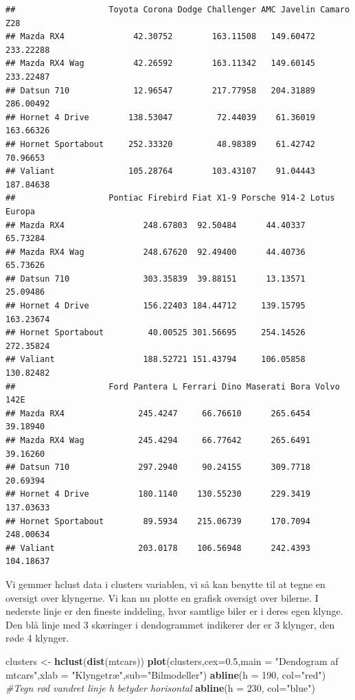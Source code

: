 \documentclass[]{book}
\newenvironment{Shaded}{\begin{snugshade}}{\end{snugshade}}
\newcommand{\CommentTok}[1]{\textcolor[rgb]{0.56,0.35,0.01}{\textit{#1}}}
\newcommand{\DataTypeTok}[1]{\textcolor[rgb]{0.13,0.29,0.53}{#1}}
\newcommand{\DecValTok}[1]{\textcolor[rgb]{0.00,0.00,0.81}{#1}}
\newcommand{\FloatTok}[1]{\textcolor[rgb]{0.00,0.00,0.81}{#1}}
\newcommand{\KeywordTok}[1]{\textcolor[rgb]{0.13,0.29,0.53}{\textbf{#1}}}
\newcommand{\NormalTok}[1]{#1}
\newcommand{\StringTok}[1]{\textcolor[rgb]{0.31,0.60,0.02}{#1}}
\begin{document}
\begin{verbatim}
##                   Toyota Corona Dodge Challenger AMC Javelin Camaro Z28
## Mazda RX4              42.30752        163.11508   149.60472  233.22288
## Mazda RX4 Wag          42.26592        163.11342   149.60145  233.22487
## Datsun 710             12.96547        217.77958   204.31889  286.00492
## Hornet 4 Drive        138.53047         72.44039    61.36019  163.66326
## Hornet Sportabout     252.33320         48.98389    61.42742   70.96653
## Valiant               105.28764        103.43107    91.04443  187.84638
##                   Pontiac Firebird Fiat X1-9 Porsche 914-2 Lotus Europa
## Mazda RX4                248.67803  92.50484      44.40337     65.73284
## Mazda RX4 Wag            248.67620  92.49400      44.40736     65.73626
## Datsun 710               303.35839  39.88151      13.13571     25.09486
## Hornet 4 Drive           156.22403 184.44712     139.15795    163.23674
## Hornet Sportabout         40.00525 301.56695     254.14526    272.35824
## Valiant                  188.52721 151.43794     106.05858    130.82482
##                   Ford Pantera L Ferrari Dino Maserati Bora Volvo 142E
## Mazda RX4               245.4247     66.76610      265.6454   39.18940
## Mazda RX4 Wag           245.4294     66.77642      265.6491   39.16260
## Datsun 710              297.2940     90.24155      309.7718   20.69394
## Hornet 4 Drive          180.1140    130.55230      229.3419  137.03633
## Hornet Sportabout        89.5934    215.06739      170.7094  248.00634
## Valiant                 203.0178    106.56948      242.4393  104.18637
\end{verbatim}

Vi gemmer hclust data i clusters variablen, vi så kan benytte til at tegne en oversigt over klyngerne.
Vi kan nu plotte en grafisk oversigt over bilerne. I nederste linje er den fineste inddeling, hvor samtlige biler er i deres egen klynge. Den blå linje med 3 skæringer i dendogrammet indikerer der er 3 klynger, den røde 4 klynger.

\begin{Shaded}
\begin{Highlighting}[]
\NormalTok{clusters <-}\StringTok{ }\KeywordTok{hclust}\NormalTok{(}\KeywordTok{dist}\NormalTok{(mtcars))}
\KeywordTok{plot}\NormalTok{(clusters,}\DataTypeTok{cex=}\FloatTok{0.5}\NormalTok{,}\DataTypeTok{main =} \StringTok{"Dendogram af mtcars"}\NormalTok{,}\DataTypeTok{xlab =} \StringTok{"Klyngetræ"}\NormalTok{,}\DataTypeTok{sub=}\StringTok{"Bilmodeller"}\NormalTok{)}
\KeywordTok{abline}\NormalTok{(}\DataTypeTok{h =} \DecValTok{190}\NormalTok{, }\DataTypeTok{col=}\StringTok{"red"}\NormalTok{) }\CommentTok{#Tegn rød vandret linje h betyder horisontal}
\KeywordTok{abline}\NormalTok{(}\DataTypeTok{h =} \DecValTok{230}\NormalTok{, }\DataTypeTok{col=}\StringTok{"blue"}\NormalTok{)}
\end{Highlighting}
\end{Shaded}
\end{document}
